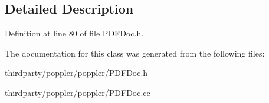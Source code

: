 \subsection{Detailed Description}


Definition at line 80 of file P\+D\+F\+Doc.\+h.



The documentation for this class was generated from the following files\+:\begin{DoxyCompactItemize}
\item 
thirdparty/poppler/poppler/P\+D\+F\+Doc.\+h\item 
thirdparty/poppler/poppler/P\+D\+F\+Doc.\+cc\end{DoxyCompactItemize}

